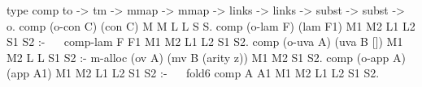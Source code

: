 \begin{elpicode}
  type comp to -> tm -> mmap -> mmap -> links -> links ->
    subst -> subst -> o.
  comp (o-con C) (con C) M M L L S S.
  comp (o-lam F) (lam F1) M1 M2 L1 L2 S1 S2 :-            ~~
    comp-lam F F1 M1 M2 L1 L2 S1 S2.
  comp (o-uva A) (uva B []) M1 M2 L L S1 S2 :- 
    m-alloc (ov A) (mv B (arity z)) M1 M2 S1 S2.
  comp (o-app A) (app A1) M1 M2 L1 L2 S1 S2 :-            ~~
    fold6 comp A A1 M1 M2 L1 L2 S1 S2.
\end{elpicode}
